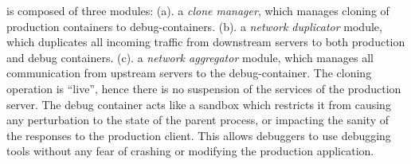 \iffalse
\parikshan is composed of three modules:
(a). a \textit{clone manager}, which manages cloning of production containers to debug-containers.
(b). a \textit{network duplicator} module, which duplicates all incoming traffic from downstream servers to both production and debug containers.
(c). a \textit{network aggregator} module, which manages all communication from upstream servers to the debug-container.
The cloning operation is ``live'', hence there is no suspension of the services of the production server.
The debug container acts like a sandbox which restricts it from causing any perturbation to the state of the parent process, or impacting the sanity of the responses to the production client.
This allows debuggers to use debugging tools without any fear of crashing or modifying the production application.



